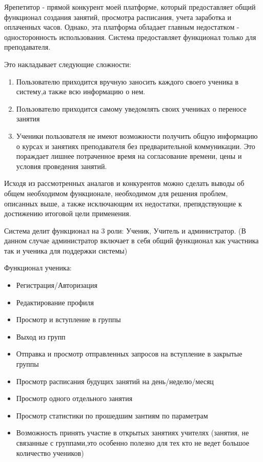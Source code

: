 \documentclass[14pt, timesnewroman]{article}
\begin{document}
Ярепетитор - прямой конкурент моей платформе, который предоставляет общий функционал создания занятий, просмотра расписания, учета заработка и оплаченных часов.
Однако, эта платформа обладает главным недостатком - односторонность использования. 
Система предоставляет функционал только для преподавателя.

Это накладывает следующие сложности:
\begin{enumerate}
    \item Пользователю приходится вручную заносить каждого своего ученика в систему,а также всю информацию о нем.
    \item Пользователю приходится самому уведомлять своих учениках о переносе занятия
    \item Ученики пользователя не имеют возможности получить общую информацию о курсах и занятиях преподавателя без предварительной коммуникации. Это пораждает лишнее потраченное время на согласование времени, цены и условия проведения занятий. 
\end{enumerate}

Исходя из рассмотренных аналагов и конкурентов можно сделать выводы об общем необходимом функционале, необходимом для решения проблем, описанных выше, а также исключающим их недостатки, препядствующие к достижению итоговой цели применения.

Система делит функционал на 3 роли: Ученик, Учитель и администратор. (В данном случае администратор включает в себя общий функционал как участника так и ученика для поддержки системы)

Функционал ученика:
\begin{itemize}
    \item Регистрация/Авторизация
    \item Редактирование профиля
    \item Просмотр и вступление в группы
    \item Выход из групп
    \item Отправка и просмотр отправленных запросов на вступление в закрытые группы
    \item Просмотр расписания будущих занятий на день/неделю/месяц
    \item Просмотр одного отдельного занятия
    \item Просмотр статистики по прошедшим зантиям по параметрам
    \item Возможность принять участие в открытых занятиях учителях (занятия, не связанные с группами,это особенно полезно для тех кто не ведет большое количество учеников)
\end{itemize}
\end{document}
